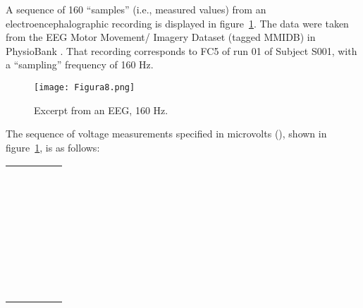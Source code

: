 \documentclass[11pt]{rMTA2010} \usepackage[utf8]{inputenc} \usepackage{graphicx} \usepackage{booktabs} \usepackage{array} \usepackage{enumerate}
\begin{document}
A sequence of 160 ``samples'' (i.e., measured values) from an electroencephalographic recording is displayed in figure~\ref{f8}. The data were taken from the EEG Motor Movement/ Imagery Dataset (tagged MMIDB) in PhysioBank \cite{b5}. That recording corresponds to FC5 of run 01 of Subject S001, with a ``sampling'' frequency of 160 Hz.

\begin{figure}[H]
\centering
\texttt{[image: Figura8.png]}
\caption{Excerpt from an EEG, 160 Hz.}
\label{f8}
\end{figure}

The sequence of voltage measurements specified in microvolts (), shown in figure~\ref{f8},  is as follows:

\vspace{4mm}

\begin{tabular}{ l l l l l }
 &  &  &  &  \\
 &  &  &  &  \\
 &  &  &  &  \\
 &  &  &  &  \\
 &  &  &  &  \\
 &  &  &  &  \\
 &  &  &  &  \\
 &  &  &  &  \\
 &  &  &  &  \\
 &  &  &  &  \\
 &  &  &  &  \\
 &  &  &  &  \\
 &  &  &  &  \\
 &  &  &  &  \\
 &  &  &  &  \\
 &  &  &  &  \\
 &  &  &  &  \\
 &  &  &  &  \\
 &  &  &  &  \\
 &  &  &  &  \\
 &  &  &  &  \\
 &  &  &  &  \\
 &  &  &  &  \\
 &  &  &  &  \\
 &  &  &  &  \\
 &  &  &  &  \\
 &  &  &  &  \\
 &  &  &  &  \\
 &  &  &  &  \\
 &  &  &  &  \\
 &  &  &  &  \\
 &  &  &  &  \\
\end{tabular}
\end{document}
